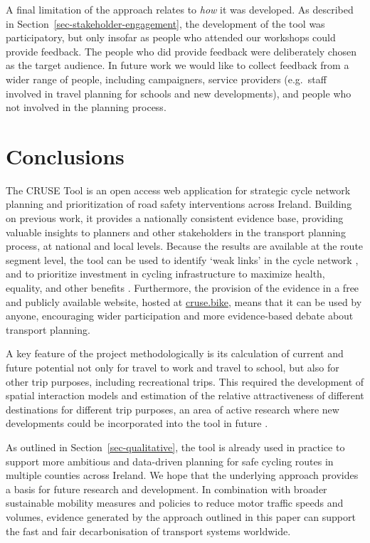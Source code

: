 \documentclass[
  super,
  preprint,
  3p]{elsarticle}
\begin{document}
{A final limitation of the approach relates to \emph{how} it was
developed. As described in Section~\ref{sec-stakeholder-engagement}, the
development of the tool was participatory, but only insofar as people
who attended our workshops could provide feedback. The people who did
provide feedback were deliberately chosen as the target audience. In
future work we would like to collect feedback from a wider range of
people, including campaigners, service providers (e.g.~staff involved in
travel planning for schools and new developments), and people who not
involved in the planning process.}

\section{Conclusions}\label{sec-conclusions}

The CRUSE Tool is an open access web application for strategic cycle
network planning and prioritization of road safety interventions across
Ireland. Building on previous work, it provides a nationally consistent
evidence base, providing valuable insights to planners and other
stakeholders in the transport planning process, at national and local
levels. Because the results are available at the route segment level,
the tool can be used to identify `weak links' in the cycle network
\citep{vybornova2022}, and to prioritize investment in cycling
infrastructure to maximize health, equality, and other benefits
\citep{mahfouz, woodcock2021}. Furthermore, the provision of the
evidence in a free and publicly available website, hosted at
\href{https://cruse.bike}{cruse.bike}, means that it can be used by
anyone, encouraging wider participation and more evidence-based debate
about transport planning.

A key feature of the project methodologically is its calculation of
current and future potential not only for travel to work and travel to
school, but also for other trip purposes, including recreational trips.
This required the development of spatial interaction models and
estimation of the relative attractiveness of different destinations for
different trip purposes, an area of active research where new
developments could be incorporated into the tool in future
\citep{hasova2022}.

As outlined in Section~\ref{sec-qualitative}, the tool is already used
in practice to support more ambitious and data-driven planning for safe
cycling routes in multiple counties across Ireland. We hope that the
underlying approach provides a basis for future research and
development. In combination with broader sustainable mobility measures
and policies to reduce motor traffic speeds and volumes, evidence
generated by the approach outlined in this paper can support the fast
and fair decarbonisation of transport systems worldwide.
\end{document}
